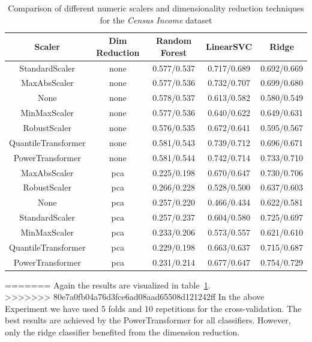\documentclass[a4paper,10pt]{article}
\begin{document}
\begin{table}[h!]
\centering
\small
\begin{tabular}{|c|c|c|c|c|}
\hline
\textbf{Scaler} & \textbf{Dim Reduction} & \textbf{Random Forest} & \textbf{LinearSVC} & \textbf{Ridge} \\
\hline
StandardScaler & none & 0.577/0.537 & 0.717/0.689 & 0.692/0.669 \\
\hline
MaxAbsScaler & none & 0.577/0.536 & 0.732/0.707 & 0.699/0.680 \\
\hline
None & none & 0.578/0.537 & 0.613/0.582 & 0.580/0.549 \\
\hline
MinMaxScaler & none & 0.577/0.536 & 0.640/0.622 & 0.649/0.631 \\
\hline
RobustScaler & none & 0.576/0.535 & 0.672/0.641 & 0.595/0.567 \\
\hline
QuantileTransformer & none &  0.581/0.543 & 0.739/0.712 & 0.696/0.671 \\
\hline
PowerTransformer & none &   \cellcolor[HTML]{C1E1C1} 0.581/0.544 & \cellcolor[HTML]{C1E1C1}  0.742/0.714 & 0.733/0.710 \\
\hline
MaxAbsScaler & pca & 0.225/0.198 & 0.670/0.647 & 0.730/0.706 \\
\hline
RobustScaler & pca & 0.266/0.228 & 0.528/0.500 & 0.637/0.603 \\
\hline
None & pca & 0.257/0.220 & 0.466/0.434 & 0.622/0.581 \\
\hline
StandardScaler & pca & 0.257/0.237 & 0.604/0.580 & 0.725/0.697 \\
\hline
MinMaxScaler & pca & 0.233/0.206 & 0.573/0.557 & 0.621/0.610 \\
\hline
QuantileTransformer & pca & 0.229/0.198 & 0.663/0.637 & 0.715/0.687 \\
\hline
PowerTransformer & pca & 0.231/0.214 & 0.677/0.647 & \cellcolor[HTML]{C1E1C1}  0.754/0.729 \\
\hline
\end{tabular}
\caption{Comparison of different numeric scalers and dimensionality reduction techniques for the \textit{Census Income} dataset}
\label{table:scaling}
\end{table}







=======
Again the results are visualized in table~\ref{table:scaling}.\\
>>>>>>> 80e7a0fb04a76d3fce6ad08aad65508d121242ff
In the above Experiment we have used 5 folds and 10 repetitions for the cross-validation. The best results are achieved by the PowerTransformer for all classifiers. However, only the ridge classifier benefited from the
dimension reduction.
\end{document}
